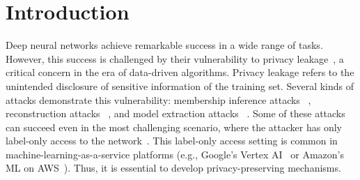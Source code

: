 \section{Introduction}
Deep neural networks achieve remarkable success in a wide range of tasks. 
However, this success is challenged by their vulnerability to privacy leakage~\citep{ref_23,ref_24,ref_25}, a critical concern in the era of data-driven algorithms. 
Privacy leakage refers to the unintended disclosure of sensitive information of the training set. 
Several kinds of attacks demonstrate this vulnerability: 
membership inference attacks%
~\citep{ref_26, ref_20, ref_28,ref_13}, 
reconstruction attacks%
~\citep{ref_29,ref_30,ref_31}, and
model extraction attacks%
~\citep{ref83,ref84,ref85}. 
Some of these attacks can succeed even in the most challenging scenario, where the attacker has only label-only access to the network~\citep{ref_12,ref_13,ref_14}.    
This label-only access setting is common 
in machine-learning-as-a-service platforms (e.g., Google’s Vertex AI~\citep{ref_103} or Amazon’s ML on AWS~\citep{ref_104}). 
Thus, it is essential to develop privacy-preserving mechanisms.


